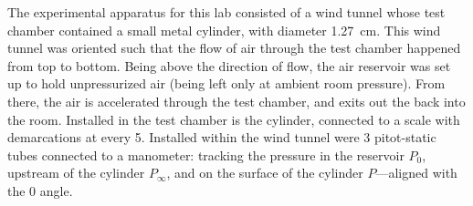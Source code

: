 The experimental apparatus for this lab consisted of a wind tunnel whose test chamber contained a small metal cylinder, with diameter \qty{1.27}{\cm}. This wind tunnel was oriented such that the flow of air through the test chamber happened from top to bottom. Being above the direction of flow, the air reservoir was set up to hold unpressurized air (being left only at ambient room pressure). From there, the air is accelerated through the test chamber, and exits out the back into the room. Installed in the test chamber is the cylinder, connected to a scale with demarcations at every \qty{5}{\deg}. Installed within the wind tunnel were 3 pitot-static tubes connected to a manometer: tracking the pressure in the reservoir \( P_{0} \), upstream of the cylinder \( P_{\infty} \), and on the surface of the cylinder \( P \)---aligned with the \qty{0}{\deg} angle.

